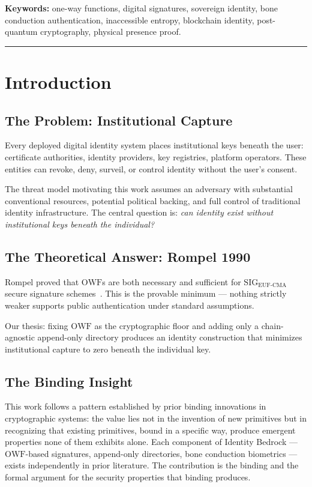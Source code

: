 \documentclass[11pt,a4paper]{article}
\theoremstyle{definition}
\newcommand{\OWF}{\mathrm{OWF}}
\newcommand{\SIG}{\mathrm{SIG}}
\newcommand{\EUFCMA}{\mathrm{EUF\text{-}CMA}}
\newcommand{\BD}{\textsf{Identity Bedrock}}
\begin{document}
\medskip
\noindent\textbf{Keywords:} one-way functions, digital signatures,
sovereign identity, bone conduction authentication, inaccessible
entropy, blockchain identity, post-quantum cryptography,
physical presence proof.

\noindent\rule{\textwidth}{0.4pt}
\tableofcontents
\newpage

\section{Introduction}

\subsection{The Problem: Institutional Capture}

Every deployed digital identity system places institutional keys
beneath the user: certificate authorities, identity providers, key
registries, platform operators. These entities can revoke, deny,
surveil, or control identity without the user's consent.

The threat model motivating this work assumes an adversary with
substantial conventional resources, potential political backing, and
full control of traditional identity infrastructure. The central
question is: \emph{can identity exist without institutional keys
beneath the individual?}

\subsection{The Theoretical Answer: Rompel 1990}

Rompel proved that $\OWF$s are both necessary and sufficient for
$\SIG_{\EUFCMA}$ secure signature schemes~\cite{Rompel90}. This is
the provable minimum --- nothing strictly weaker supports public
authentication under standard assumptions.

Our thesis: fixing $\OWF$ as the cryptographic floor and adding only
a chain-agnostic append-only directory produces an identity
construction that minimizes institutional capture to zero beneath
the individual key.

\subsection{The Binding Insight}

This work follows a pattern established by prior binding innovations
in cryptographic systems: the value lies not in the invention of new
primitives but in recognizing that existing primitives, bound in a
specific way, produce emergent properties none of them exhibits alone.
Each component of \BD{} --- $\OWF$-based signatures, append-only
directories, bone conduction biometrics --- exists independently in
prior literature. The contribution is the binding and the formal
argument for the security properties that binding produces.
\end{document}
